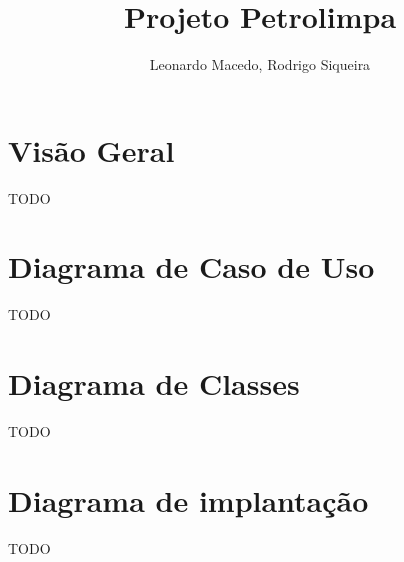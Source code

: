 \documentclass[a4paper,10pt]{article}
\title{Projeto Petrolimpa}
\author{Leonardo Macedo, Rodrigo Siqueira}
\begin{document}
 	\maketitle
 	\titlepage
 	\tableofcontents

\newpage
\section{Visão Geral}
TODO

\newpage
\section{Diagrama de Caso de Uso}
	TODO

\newpage
\section{Diagrama de Classes}
	TODO

\newpage
\section{Diagrama de implantação}
TODO
\end{document}
